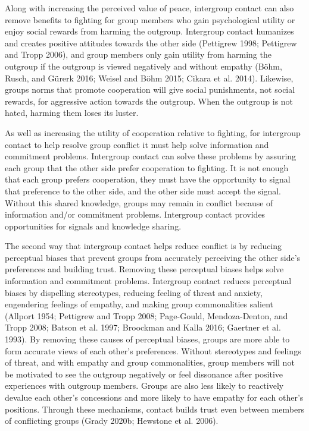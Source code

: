 \documentclass[11pt]{article}
\begin{document}
Along with increasing the perceived value of peace, intergroup contact
can also remove benefits to fighting for group members who gain
psychological utility or enjoy social rewards from harming the outgroup.
Intergroup contact humanizes and creates positive attitudes towards the
other side (Pettigrew 1998; Pettigrew and Tropp 2006), and group members
only gain utility from harming the outgroup if the outgroup is viewed
negatively and without empathy (Böhm, Rusch, and Gürerk 2016; Weisel and
Böhm 2015; Cikara et al. 2014). Likewise, groups norms that promote
cooperation will give social punishments, not social rewards, for
aggressive action towards the outgroup. When the outgroup is not hated,
harming them loses its luster.

As well as increasing the utility of cooperation relative to fighting,
for intergroup contact to help resolve group conflict it must help solve
information and commitment problems. Intergroup contact can solve these
problems by assuring each group that the other side prefer cooperation
to fighting. It is not enough that each group prefers cooperation, they
must have the opportunity to signal that preference to the other side,
and the other side must accept the signal. Without this shared
knowledge, groups may remain in conflict because of information and/or
commitment problems. Intergroup contact provides opportunities for
signals and knowledge sharing.

The second way that intergroup contact helps reduce conflict is by
reducing perceptual biases that prevent groups from accurately
perceiving the other side's preferences and building trust. Removing
these perceptual biases helps solve information and commitment problems.
Intergroup contact reduces perceptual biases by dispelling stereotypes,
reducing feeling of threat and anxiety, engendering feelings of empathy,
and making group commonalities salient (Allport 1954; Pettigrew and
Tropp 2008; Page-Gould, Mendoza-Denton, and Tropp 2008; Batson et al.
1997; Broockman and Kalla 2016; Gaertner et al. 1993). By removing these
causes of perceptual biases, groups are more able to form accurate views
of each other's preferences. Without stereotypes and feelings of threat,
and with empathy and group commonalities, group members will not be
motivated to see the outgroup negatively or feel dissonance after
positive experiences with outgroup members. Groups are also less likely
to reactively devalue each other's concessions and more likely to have
empathy for each other's positions. Through these mechanisms, contact
builds trust even between members of conflicting groups (Grady 2020b;
Hewstone et al. 2006).
\end{document}
